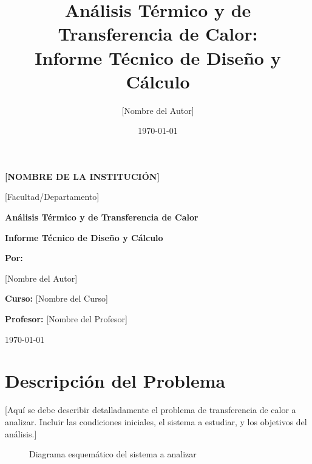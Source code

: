 \documentclass[12pt,letterpaper]{article}
\title{Análisis Térmico y de Transferencia de Calor:\\ Informe Técnico de Diseño y Cálculo}
\author{[Nombre del Autor]}
\date{\today}
\begin{document}
\begin{titlepage}
    \centering
    \vspace*{2cm}
    
    {\Large \textbf{[NOMBRE DE LA INSTITUCIÓN]} \par}
    \vspace{1cm}
    {\large [Facultad/Departamento] \par}
    \vspace{2cm}
    
    {\huge \textbf{Análisis Térmico y de Transferencia de Calor} \par}
    \vspace{0.5cm}
    {\Large \textbf{Informe Técnico de Diseño y Cálculo} \par}
    \vspace{2cm}
    
    {\large \textbf{Por:} \par}
    {\large [Nombre del Autor] \par}
    \vspace{1cm}
    
    {\large \textbf{Curso:} [Nombre del Curso] \par}
    {\large \textbf{Profesor:} [Nombre del Profesor] \par}
    \vspace{2cm}
    
    {\large \today \par}
    
    \vfill
\end{titlepage}

\newpage
\section{Descripción del Problema}

[Aquí se debe describir detalladamente el problema de transferencia de calor a analizar. Incluir las condiciones iniciales, el sistema a estudiar, y los objetivos del análisis.]

\vspace{1cm}
\begin{figure}[H]
    \centering
    \caption{Diagrama esquemático del sistema a analizar}
    \label{fig:diagrama_problema}
\end{figure}
\end{document}
